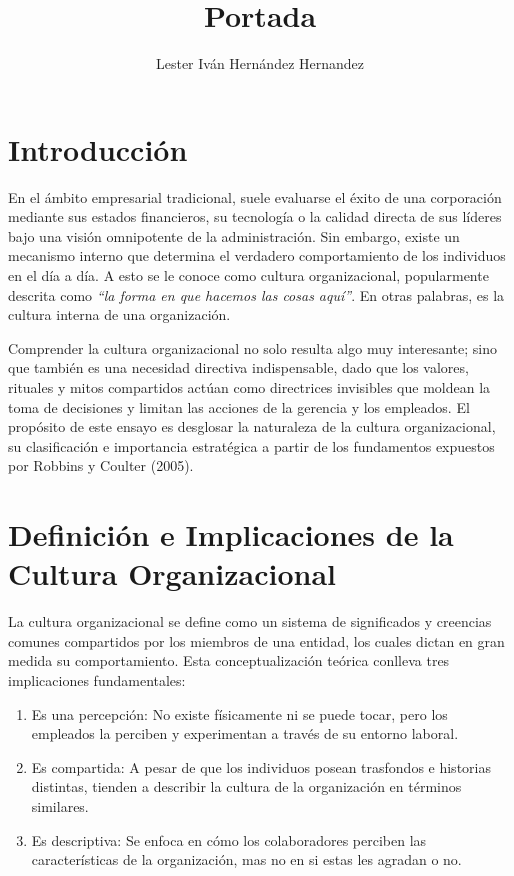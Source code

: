 \documentclass{article}
\title{Portada}
\author{Lester Iván Hernández Hernandez}
\begin{document}
    \portada{}

    \newpage

    \section{Introducción}

    En el ámbito empresarial tradicional, suele evaluarse el éxito de una corporación mediante sus estados financieros, su tecnología o la calidad directa de sus líderes bajo una visión omnipotente de la administración. Sin embargo, existe un mecanismo interno que determina el verdadero comportamiento de los individuos en el día a día. A esto se le conoce como cultura organizacional, popularmente descrita como \textit{``la forma en que hacemos las cosas aquí''}. En otras palabras, es la cultura interna de una organización.

    Comprender la cultura organizacional no solo resulta algo muy interesante; sino que también es una necesidad directiva indispensable, dado que los valores, rituales y mitos compartidos actúan como directrices invisibles que moldean la toma de decisiones y limitan las acciones de la gerencia y los empleados. El propósito de este ensayo es desglosar la naturaleza de la cultura organizacional, su clasificación e importancia estratégica a partir de los fundamentos expuestos por Robbins y Coulter (2005).

    \section{Definición e Implicaciones de la Cultura Organizacional}

    La cultura organizacional se define como un sistema de significados y creencias comunes compartidos por los miembros de una entidad, los cuales dictan en gran medida su comportamiento. Esta conceptualización teórica conlleva tres implicaciones fundamentales:

    \begin{enumerate}
        \item Es una percepción: No existe físicamente ni se puede tocar, pero los empleados la perciben y experimentan a través de su entorno laboral.
        \item Es compartida: A pesar de que los individuos posean trasfondos e historias distintas, tienden a describir la cultura de la organización en términos similares.
        \item Es descriptiva: Se enfoca en cómo los colaboradores perciben las características de la organización, mas no en si estas les agradan o no.
    \end{enumerate}
\end{document}
